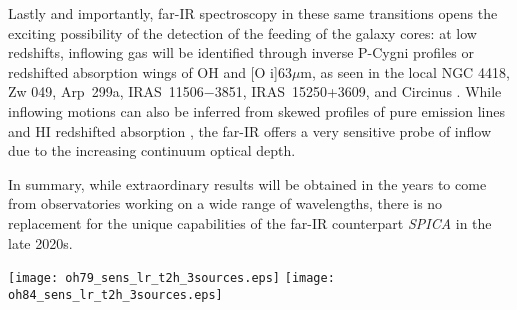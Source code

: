 \documentclass{pasa}%
\newcommand{\kms}{{\hbox {km\thinspace s$^{-1}$}}}
\newcommand{\hdo}{{\hbox {H$_{2}$O}}}
\begin{document}
Lastly and importantly, far-IR spectroscopy in these same transitions opens
the exciting possibility of the detection of the feeding of the galaxy cores:
at low redshifts, inflowing gas will be identified through
inverse P-Cygni profiles or redshifted absorption wings of OH and 
[O {\sc i}]63$\mu$m, as seen in the local NGC 4418, Zw 049, Arp~299a,
IRAS~11506$-$3851, IRAS~15250+3609, and Circinus 
\citep[][GA17]{gon12,fal15,fal17,sto16}.
While inflowing motions can also be inferred from skewed profiles of pure
emission lines and HI redshifted absorption \citep{cos13}, the far-IR
offers a very sensitive probe of inflow due to the increasing
continuum optical depth. 

In summary, while extraordinary results will be obtained in the years to come
from observatories working on a wide range of wavelengths, 
there is no replacement for the unique capabilities of 
the far-IR counterpart {\it SPICA} in the late 2020s. 

\begin{figure*}
\begin{center}
\texttt{[image: oh79\_sens\_lr\_t2h\_3sources.eps]}
\texttt{[image: oh84\_sens\_lr\_t2h\_3sources.eps]}
\caption{{\bf Upper panels.}
{\it Left}: Predicted integrated absorbing flux of the OH79 doublet in
three local ULIRGs (IRAS~03158+4227, Mrk~231, and IRAS~23365+3604, all showing
P-Cygni profiles in OH79) at blueshifted velocities 
(from $-1000$ \kms\ to 0 \kms) as
a function of redshift (red numbers) and observed wavelength (abscissa). 
The black curve shows the sensitivity ($1\sigma$) expected for 
{\it SPICA}/SAFARI LR ($R=300$) with 2 hours of observing time, indicating
that molecular outflows would be easily detected in ULIRGs up to $z=1.3-1.9$. 
{\it Right}: The continuum-normalized OH79 spectrum of Mrk~231 as observed
with {\it Herschel}/PACS smoothed to the
resolution of {\it SPICA}/SAFARI LR, with 2 spectral points per resolution
element. The three errorbars in each spectral channel indicate the $\pm\sigma$
uncertainty for SAFARI with 2 hours of observing time at the selected
redshifts of $z=0.5$, $1.0$, and $1.5$. The absortion at $V<-1300$ \kms\ is
due to \hdo\ $4_{23}-3_{12}$. Note that not only the blueshifted absorption 
wing would be detected, but also the redshifted emission feature
(i.e. P-Cygni), unambiguously revealing outflowing gas.
{\bf Lower panels.} The corresponding predictions for the excited OH84
doublet. Fluxes are shown for velocities between $-1000$ and $-250$ \kms. In
the right-hand panel the absorption around $2000$ \kms\ is due to $^{18}$OH
with possible contribution by NH$_3$ in some sources (see GA12).
} 
\label{oh79_lr}
\end{center}
\end{figure*}
\end{document}
